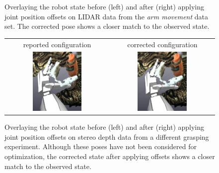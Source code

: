 \begin{figure}
\begin{tabular}{c:c}
\end{tabular}
\caption[Calibrated pose on LIAR data]{Overlaying the robot state before (left) and after (right) applying joint position offsets on LIDAR data from the \textit{arm movement} data set. The corrected pose shows a closer match to the observed state.}
\label{fig:lidar_corrected_state}
\end{figure}


\begin{figure}
\centering
\begin{tabular}{c:c}
reported configuration & corrected configuration \\
\includegraphics[width=0.5\textwidth]{images/offset/visual_verification/rep_grasp.png} & \includegraphics[width=0.5\textwidth]{images/offset/visual_verification/corr_grasp.png} \\
\end{tabular}
\caption[Calibrated pose on stereo depth data]{Overlaying the robot state before (left) and after (right) applying joint position offsets on stereo depth data from a different grasping experiment. Although these poses have not been considered for optimization, the corrected state after applying offsets shows a closer match to the observed state.}
\label{fig:stereo_corrected_state}
\end{figure}


